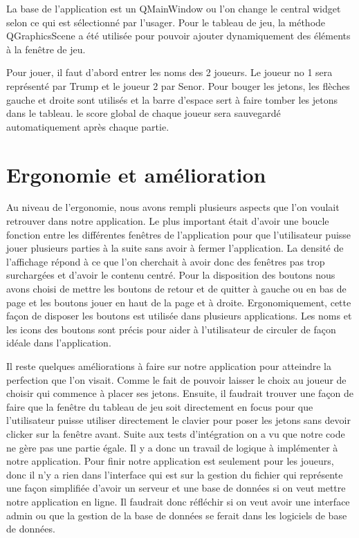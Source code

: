 La base de l’application est un QMainWindow ou l’on change le central widget selon ce qui est sélectionné par l’usager.
Pour le tableau de jeu, la méthode QGraphicsScene a été utilisée pour pouvoir ajouter dynamiquement des éléments à la fenêtre de jeu.

Pour jouer, il faut d'abord entrer les noms des 2 joueurs.
Le joueur no 1 sera représenté par Trump et le joueur 2 par Senor.
Pour bouger les jetons, les flèches gauche et droite sont utilisés et la barre d’espace sert à faire tomber les jetons dans le tableau.
le score global de chaque joueur sera sauvegardé automatiquement après chaque partie.

\section{Ergonomie et amélioration}

Au niveau de l'ergonomie, nous avons rempli plusieurs aspects que l'on voulait retrouver dans notre application.
Le plus important était d'avoir une boucle fonction entre les différentes fenêtres de l'application pour que l'utilisateur puisse jouer plusieurs parties à la suite sans avoir à fermer l'application.
La densité de l'affichage répond à ce que l'on cherchait à avoir donc des fenêtres pas trop surchargées et d'avoir le contenu centré.
Pour la disposition des boutons nous avons choisi de mettre les boutons de retour et de quitter à gauche ou en bas de page et les boutons jouer en haut de la page et à droite.
Ergonomiquement, cette façon de disposer les boutons est utilisée dans plusieurs applications.
Les noms et les icons des boutons sont précis pour aider à l'utilisateur de circuler de façon idéale dans l'application.

Il reste quelques améliorations à faire sur notre application pour atteindre la perfection que l'on visait.
Comme le fait de pouvoir laisser le choix au joueur de choisir qui commence à placer ses jetons.
Ensuite, il faudrait trouver une façon de faire que la fenêtre du tableau de jeu soit directement en focus pour que l'utilisateur puisse utiliser directement le clavier pour poser les jetons sans devoir clicker sur la fenêtre avant.
Suite aux tests d'intégration on a vu que notre code ne gère pas une partie égale.
Il y a donc un travail de logique à implémenter à notre application.
Pour finir notre application est seulement pour les joueurs, donc il n'y a rien dans l'interface qui est sur la gestion du fichier qui représente une façon simplifiée d'avoir un serveur et une base de données si on veut mettre notre application en ligne.
Il faudrait donc réfléchir si on veut avoir une interface admin ou que la gestion de la base de données se ferait dans les logiciels de base de données.

